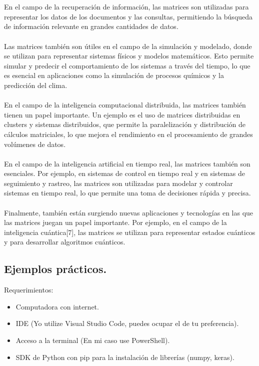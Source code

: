 \documentclass{article}
\theoremstyle{mytheoremstyle}
\theoremstyle{mytheoremstyle}
\theoremstyle{myproblemstyle}
\begin{document}
\\
\\
En el campo de la recuperación de información, las matrices son utilizadas para representar los datos de los documentos y las consultas, permitiendo la búsqueda de información relevante en grandes cantidades de datos.
\\
\\
Las matrices también son útiles en el campo de la simulación y modelado, donde se utilizan para representar sistemas físicos y modelos matemáticos. Esto permite simular y predecir el comportamiento de los sistemas a través del tiempo, lo que es esencial en aplicaciones como la simulación de procesos químicos y la predicción del clima.
\\
\\
En el campo de la inteligencia computacional distribuida, las matrices también tienen un papel importante. Un ejemplo es el uso de matrices distribuidas en clusters y sistemas distribuidos, que permite la paralelización y distribución de cálculos matriciales, lo que mejora el rendimiento en el procesamiento de grandes volúmenes de datos.
\\
\\
En el campo de la inteligencia artificial en tiempo real, las matrices también son esenciales. Por ejemplo, en sistemas de control en tiempo real y en sistemas de seguimiento y rastreo, las matrices son utilizadas para modelar y controlar sistemas en tiempo real, lo que permite una toma de decisiones rápida y precisa.
\\
\\
Finalmente, también están surgiendo nuevas aplicaciones y tecnologías en las que las matrices juegan un papel importante. Por ejemplo, en el campo de la inteligencia cuántica[7], las matrices se utilizan para representar estados cuánticos y para desarrollar algoritmos cuánticos.

\subsection{Ejemplos prácticos.}

Requerimientos:

\begin{itemize}
    \item Computadora con internet.
    \item IDE (Yo utilize Visual Studio Code, puedes ocupar el de tu preferencia).
    \item Acceso a la terminal (En mi caso use PowerShell).
    \item SDK de Python con pip para la instalación de librerías (numpy, keras).
    \end{itemize}
\end{document}
